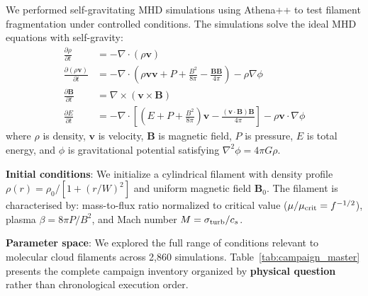 \documentclass[twocolumn]{mnras}
\begin{document}
We performed self-gravitating MHD simulations using Athena++ \citep{Stone2020} to test filament fragmentation under controlled conditions. The simulations solve the ideal MHD equations with self-gravity:
\begin{align}
\frac{\partial \rho}{\partial t} &= -\nabla \cdot (\rho \mathbf{v}) \\
\frac{\partial (\rho \mathbf{v})}{\partial t} &= -\nabla \cdot \left(\rho \mathbf{v} \mathbf{v} + P + \frac{B^2}{8\pi} - \frac{\mathbf{B}\mathbf{B}}{4\pi}\right) - \rho \nabla \phi \\
\frac{\partial \mathbf{B}}{\partial t} &= \nabla \times (\mathbf{v} \times \mathbf{B}) \\
\frac{\partial E}{\partial t} &= -\nabla \cdot \left[(E + P + \frac{B^2}{8\pi})\mathbf{v} - \frac{(\mathbf{v} \cdot \mathbf{B})\mathbf{B}}{4\pi}\right] - \rho \mathbf{v} \cdot \nabla \phi
\end{align}
where $\rho$ is density, $\mathbf{v}$ is velocity, $\mathbf{B}$ is magnetic field, $P$ is pressure, $E$ is total energy, and $\phi$ is gravitational potential satisfying $\nabla^2 \phi = 4\pi G\rho$.

\textbf{Initial conditions}: We initialize a cylindrical filament with density profile $\rho(r) = \rho_0 / [1 + (r/W)^2]$ and uniform magnetic field $\mathbf{B}_0$. The filament is characterised by: mass-to-flux ratio normalized to critical value ($\mu/\mu_{\rm crit} = f^{-1/2}$), plasma $\beta = 8\pi P/B^2$, and Mach number $M = \sigma_{\rm turb}/c_s$.

\textbf{Parameter space}: We explored the full range of conditions relevant to molecular cloud filaments across 2,860 simulations. Table~\ref{tab:campaign_master} presents the complete campaign inventory organized by \textbf{physical question} rather than chronological execution order.
\end{document}
